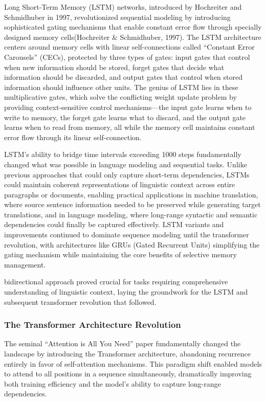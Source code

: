 \documentclass[
  titlepage]{article}
\begin{document}
Long Short-Term Memory (LSTM) networks, introduced by Hochreiter and
Schmidhuber in 1997, revolutionized sequential modeling by introducing
sophisticated gating mechanisms that enable constant error flow through
specially designed memory cells(Hochreiter \& Schmidhuber, 1997). The
LSTM architecture centers around memory cells with linear
self-connections called ``Constant Error Carousels'' (CECs), protected
by three types of gates: input gates that control when new information
should be stored, forget gates that decide what information should be
discarded, and output gates that control when stored information should
influence other units. The genius of LSTM lies in these multiplicative
gates, which solve the conflicting weight update problem by providing
context-sensitive control mechanisms---the input gate learns when to
write to memory, the forget gate learns what to discard, and the output
gate learns when to read from memory, all while the memory cell
maintains constant error flow through its linear self-connection.

LSTM's ability to bridge time intervals exceeding 1000 steps
fundamentally changed what was possible in language modeling and
sequential tasks. Unlike previous approaches that could only capture
short-term dependencies, LSTMs could maintain coherent representations
of linguistic context across entire paragraphs or documents, enabling
practical applications in machine translation, where source sentence
information needed to be preserved while generating target translations,
and in language modeling, where long-range syntactic and semantic
dependencies could finally be captured effectively. LSTM variants and
improvements continued to dominate sequence modeling until the
transformer revolution, with architectures like GRUs (Gated Recurrent
Units) simplifying the gating mechanism while maintaining the core
benefits of selective memory management.

bidirectional approach proved crucial for tasks requiring comprehensive
understanding of linguistic context, laying the groundwork for the LSTM
and subsequent transformer revolution that followed.

\subsubsection{The Transformer Architecture
Revolution}\label{the-transformer-architecture-revolution}

The seminal ``Attention is All You Need'' paper fundamentally changed
the landscape by introducing the Transformer architecture, abandoning
recurrence entirely in favor of self-attention mechanisms. This paradigm
shift enabled models to attend to all positions in a sequence
simultaneously, dramatically improving both training efficiency and the
model's ability to capture long-range dependencies.
\end{document}
